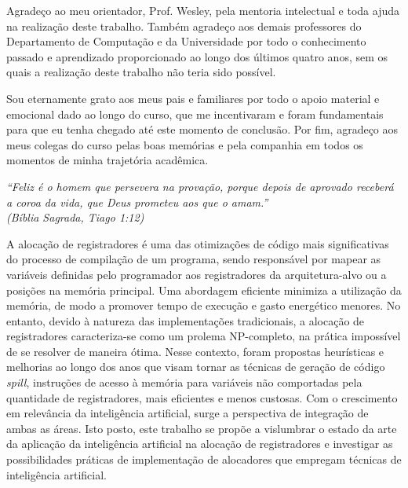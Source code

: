 \documentclass[
	12pt,				%
	openright,			%
	twoside,			%
	a4paper,			%
	tcc,			%
	]{ABNT-DC-UEL}
\begin{document}
\begin{agradecimentos}
Agradeço ao meu orientador, Prof. Wesley, pela mentoria intelectual e toda ajuda na realização deste trabalho. Também agradeço aos demais professores do Departamento de Computação e da Universidade por todo o conhecimento passado e aprendizado proporcionado ao longo dos últimos quatro anos, sem os quais a realização deste trabalho não teria sido possível.

Sou eternamente grato aos meus pais e familiares por todo o apoio material e emocional dado ao longo do curso, que me incentivaram e foram fundamentais para que eu tenha chegado até este momento de conclusão. Por fim, agradeço aos meus colegas do curso pelas boas memórias e pela companhia em todos os momentos de minha trajetória acadêmica.
\end{agradecimentos}

\begin{epigrafe}
  \vspace*{\fill}
  \hspace{.4\textwidth}
  \begin{minipage}{.5\textwidth}   
    \begin{flushright}
	\textit{
    ``Feliz é o homem que persevera na provação, 
    porque depois de aprovado receberá a coroa da vida,
    que Deus prometeu aos que o amam.''\\
      (Bíblia Sagrada, Tiago 1:12)}
    \end{flushright}
  \end{minipage}
\end{epigrafe}


\begin{resumo}
A alocação de registradores é uma das otimizações de código mais significativas do processo de compilação de um programa, sendo responsável por mapear as variáveis definidas pelo programador aos registradores da arquitetura-alvo ou a posições na memória principal. Uma abordagem eficiente minimiza a utilização da memória, de modo a promover tempo de execução e gasto energético menores. No entanto, devido à natureza das implementações tradicionais, a alocação de registradores caracteriza-se como um prolema NP-completo, na prática impossível de se resolver de maneira ótima. Nesse contexto, foram propostas heurísticas e melhorias ao longo dos anos que visam tornar as técnicas de geração de código \textit{spill}, instruções de acesso à memória para variáveis não comportadas pela quantidade de registradores, mais eficientes e menos custosas. Com o crescimento em relevância da inteligência artificial, surge a perspectiva de integração de ambas as áreas. Isto posto, este trabalho se propõe a vislumbrar o estado da arte da aplicação da inteligência artificial na alocação de registradores e investigar as possibilidades práticas de implementação de alocadores que empregam técnicas de inteligência artificial.
\end{resumo}
\end{document}
